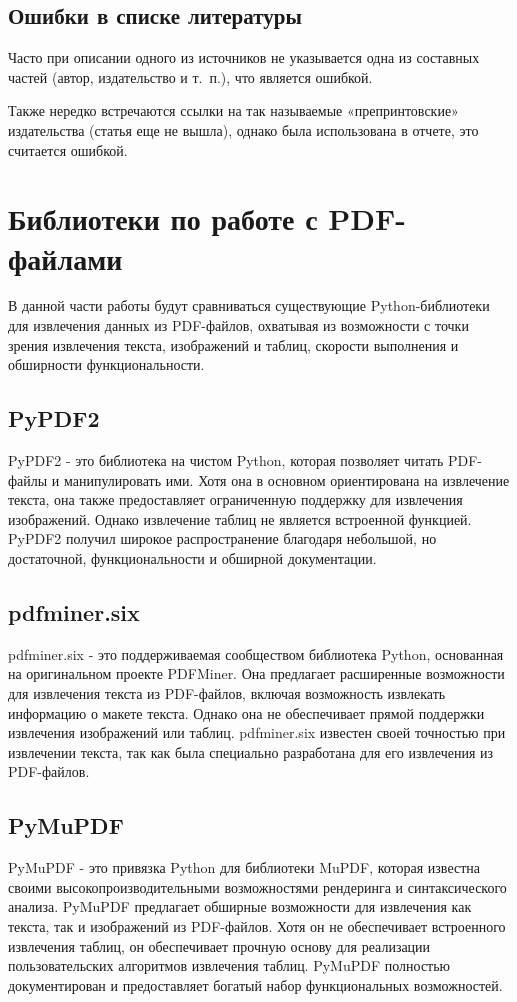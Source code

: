 \subsection{Ошибки в списке литературы}
Часто при описании одного из источников не указывается одна из составных частей (автор, издательство и т.~п.), что является ошибкой.

Также нередко встречаются ссылки на так называемые «препринтовские» издательства (статья еще не вышла), однако была использована в отчете, это считается ошибкой.

\section{Библиотеки по работе с PDF-файлами}
В данной части работы будут сравниваться существующие Python-библиотеки для извлечения данных из PDF-файлов, охватывая из возможности с точки зрения извлечения текста, изображений и таблиц, скорости выполнения и обширности функциональности.
\subsection{PyPDF2}
PyPDF2 - это библиотека на чистом Python, которая позволяет читать PDF-файлы и манипулировать ими. Хотя она в основном ориентирована на извлечение текста, она также предоставляет ограниченную поддержку для извлечения изображений. Однако извлечение таблиц не является встроенной функцией. PyPDF2 получил широкое распространение благодаря небольшой, но достаточной, функциональности и обширной документации.
\subsection{pdfminer.six}
pdfminer.six - это поддерживаемая сообществом библиотека Python, основанная на оригинальном проекте PDFMiner. Она предлагает расширенные возможности для извлечения текста из PDF-файлов, включая возможность извлекать информацию о макете текста. Однако она не обеспечивает прямой поддержки извлечения изображений или таблиц. pdfminer.six известен своей точностью при извлечении текста, так как была специально разработана для его извлечения из PDF-файлов.
\subsection{PyMuPDF}
PyMuPDF - это привязка Python для библиотеки MuPDF, которая известна своими высокопроизводительными возможностями рендеринга и синтаксического анализа. PyMuPDF предлагает обширные возможности для извлечения как текста, так и изображений из PDF-файлов. Хотя он не обеспечивает встроенного извлечения таблиц, он обеспечивает прочную основу для реализации пользовательских алгоритмов извлечения таблиц. PyMuPDF полностью документирован и предоставляет богатый набор функциональных возможностей.

